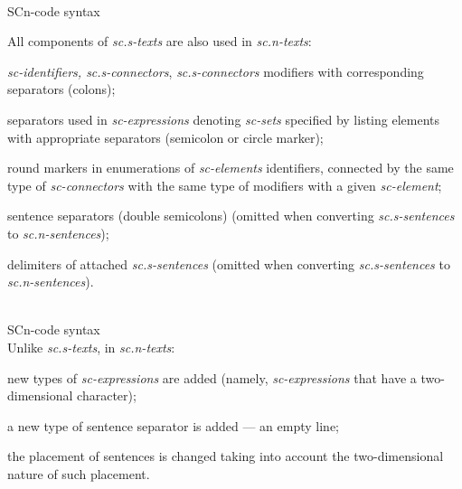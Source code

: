 \begin{frame}{\\SCn-code syntax}
	\topline
	\justifying
	\vspace*{\fill}\\
	\small{
		All components of \textit{sc.s-texts} are also used in \textit{sc.n-texts}:
		\begin{textitemize}
			\item \textit{sc-identifiers, sc.s-connectors}, \textit{sc.s-connectors} modifiers with corresponding separators (colons);
			\item separators used in \textit{sc-expressions} denoting \textit{sc-sets} specified by listing elements with appropriate separators (semicolon or circle marker);
			\item round markers in enumerations of \textit{sc-elements} identifiers, connected by the same type of \textit{sc-connectors} with the same type of modifiers with a given \textit{sc-element};
			\item sentence separators (double semicolons) (omitted when converting \textit{sc.s-sentences} to \textit{sc.n-sentences});
			\item delimiters of attached \textit{sc.s-sentences} (omitted when converting \textit{sc.s-sentences} to \textit{sc.n-sentences}).
		\end{textitemize}
	}
\end{frame}

\begin{frame}{\\SCn-code syntax}
	\topline
	\justifying
	\vspace*{\fill}\\
	Unlike \textit{sc.s-texts}, in \textit{sc.n-texts}:
	\begin{textitemize}
		\item new types of \textit{sc-expressions} are added (namely, \textit{sc-expressions} that have a two-dimensional character);
		\item a new type of sentence separator is added --- an empty line;
		\item the placement of sentences is changed taking into account the two-dimensional nature of such placement.
	\end{textitemize}
\end{frame}

